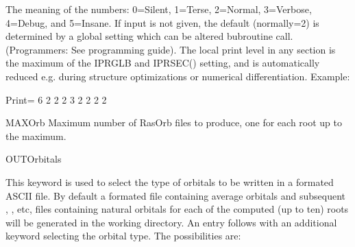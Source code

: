 \begin{keywordlist}
The meaning of the numbers: 0=Silent, 1=Terse, 2=Normal, 3=Verbose, 4=Debug,
and 5=Insane. If input is not given, the default (normally=2) is determined
by a global setting which can be altered bubroutine call.
(Programmers: See programming guide). The local print level in any section is
the maximum of the IPRGLB and IPRSEC() setting, and is automatically reduced
e.g. during structure optimizations or numerical differentiation. Example:
\begin{inputlisting}
Print= 6 2 2 2 3 2 2 2 2
\end{inputlisting}
\item[MAXOrb]
Maximum number of RasOrb files to produce, one for each root up to the maximum.
\item[OUTOrbitals]

This keyword is used to select the type of orbitals to be written
in a formated ASCII file. By default a formated  file
containing average orbitals and subsequent ,
, etc, files containing natural orbitals for each
of the computed (up to ten) roots will be generated in the working directory.
An entry follows with an additional keyword selecting the orbital type.
The possibilities are:


\end{keywordlist}
